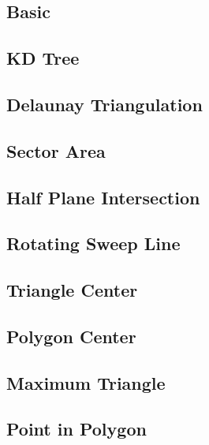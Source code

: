 \documentclass[a4paper,10pt,twocolumn,oneside]{article}
\begin{document}
\subsection{Basic}

\subsection{KD Tree}

\subsection{Delaunay Triangulation}

\subsection{Sector Area}

% 
\subsection{Half Plane Intersection}

\subsection{Rotating Sweep Line}

\subsection{Triangle Center}

\subsection{Polygon Center}

\subsection{Maximum Triangle}

\subsection{Point in Polygon}

% 
% 
% 
\end{document}
